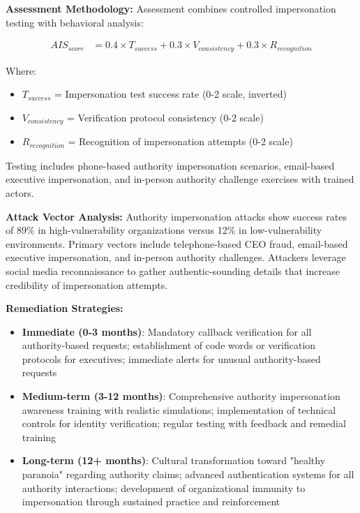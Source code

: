 \documentclass[11pt,a4paper]{article}
\begin{document}
\textbf{Assessment Methodology:}
Assessment combines controlled impersonation testing with behavioral analysis:

\begin{align}
AIS_{score} &= 0.4 \times T_{success} + 0.3 \times V_{consistency} + 0.3 \times R_{recognition}
\end{align}

Where:
\begin{itemize}
\item $T_{success}$ = Impersonation test success rate (0-2 scale, inverted)
\item $V_{consistency}$ = Verification protocol consistency (0-2 scale)
\item $R_{recognition}$ = Recognition of impersonation attempts (0-2 scale)
\end{itemize}

Testing includes phone-based authority impersonation scenarios, email-based executive impersonation, and in-person authority challenge exercises with trained actors.

\textbf{Attack Vector Analysis:}
Authority impersonation attacks show success rates of 89\% in high-vulnerability organizations versus 12\% in low-vulnerability environments. Primary vectors include telephone-based CEO fraud, email-based executive impersonation, and in-person authority challenges. Attackers leverage social media reconnaissance to gather authentic-sounding details that increase credibility of impersonation attempts.

\textbf{Remediation Strategies:}
\begin{itemize}
\item \textbf{Immediate (0-3 months)}: Mandatory callback verification for all authority-based requests; establishment of code words or verification protocols for executives; immediate alerts for unusual authority-based requests
\item \textbf{Medium-term (3-12 months)}: Comprehensive authority impersonation awareness training with realistic simulations; implementation of technical controls for identity verification; regular testing with feedback and remedial training
\item \textbf{Long-term (12+ months)}: Cultural transformation toward "healthy paranoia" regarding authority claims; advanced authentication systems for all authority interactions; development of organizational immunity to impersonation through sustained practice and reinforcement
\end{itemize}
\end{document}
